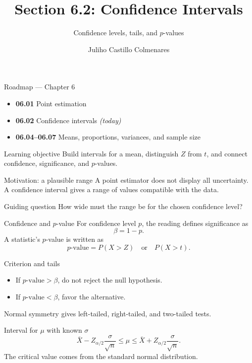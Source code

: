 \documentclass[10pt,aspectratio=169]{beamer}
\title[Confidence Intervals]{Section 6.2: Confidence Intervals}
\subtitle{Confidence levels, tails, and $p$-values}
\author[J. Castillo Colmenares]{Juliho Castillo Colmenares}
\institute{Tecnológico de Monterrey}
\date{}
\begin{document}
\begin{frame}[plain]\vspace{-0.8cm}\titlepage\end{frame}

\begin{frame}{Roadmap --- Chapter 6}
  \footnotesize
  \begin{itemize}\itemsep=0.08cm
    \item \textbf{06.01} Point estimation
    \item \textbf{06.02} Confidence intervals \emph{(today)}
    \item \textbf{06.04--06.07} Means, proportions, variances, and sample size
  \end{itemize}
  \begin{block}{Learning objective}
    Build intervals for a mean, distinguish $Z$ from $t$, and connect confidence,
    significance, and $p$-values.
  \end{block}
\end{frame}

\begin{frame}{Motivation: a plausible range}
  \footnotesize
  A point estimator does not display all uncertainty. A confidence interval gives
  a range of values compatible with the data.
  \begin{alertblock}{Guiding question}
    How wide must the range be for the chosen confidence level?
  \end{alertblock}
\end{frame}

\begin{frame}{Confidence and $p$-value}
  \footnotesize
  For confidence level $p$, the reading defines significance as
  \[
    \beta=1-p.
  \]
  A statistic's $p$-value is written as
  \[
    p\text{-value}=P(X>Z)\quad\text{or}\quad P(X>t).
  \]
\end{frame}

\begin{frame}{Criterion and tails}
  \footnotesize
  \begin{itemize}\itemsep=0.12cm
    \item If $p\text{-value}>\beta$, do not reject the null hypothesis.
    \item If $p\text{-value}<\beta$, favor the alternative.
  \end{itemize}
  Normal symmetry gives left-tailed, right-tailed, and two-tailed tests.
\end{frame}

\begin{frame}{Interval for $\mu$ with known $\sigma$}
  \footnotesize
  \[
    \bar X-Z_{\alpha/2}\frac{\sigma}{\sqrt n}
    \le\mu\le
    \bar X+Z_{\alpha/2}\frac{\sigma}{\sqrt n}.
  \]
  The critical value comes from the standard normal distribution.
\end{frame}
\end{document}
